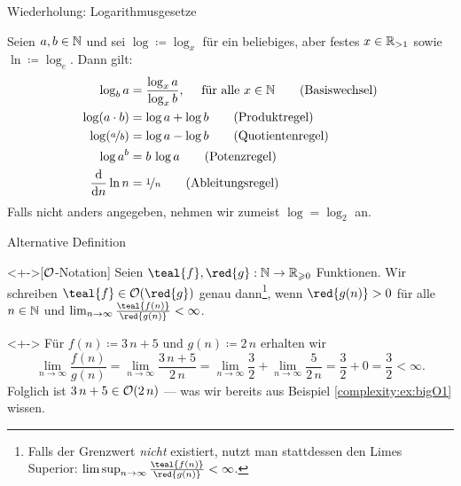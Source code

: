\begin{frame}{Wiederholung: Logarithmusgesetze}
\begin{theorem}
Seien $a, b \in \mathbb{N}$ und sei $\log \coloneqq \log_x$ f\"ur ein beliebiges, aber festes $x \in \mathbb{R}_{>1}$ sowie $\ln \coloneqq \log_e$. Dann gilt:
\begin{align*}
    \log_b a &= \frac{\log_x a}{\log_x b}, \quad \text{ f\"ur alle $x \in \mathbb{N}$}\tag{Basiswechsel} \\
    \log(a \cdot b) &= \log a + \log b\tag{Produktregel} \\
    \log(\nicefrac{a}{b}) &= \log a - \log b\tag{Quotientenregel} \\
    \log a^b &= b \, \log a\tag{Potenzregel}\\
    \frac{\text{d}}{\text{d}n} \ln n &= \nicefrac{1}{n}\tag{Ableitungsregel}
\end{align*}
Falls nicht anders angegeben, nehmen wir zumeist $\log = \log_2$ an.
\end{theorem}
\end{frame}

\begin{frame}{Alternative Definition}
\begin{definition}<+->[$\mathcal{O}$-Notation]
Seien $\teal{f}, \red{g}: \nat \to \realpos$ Funktionen.
Wir schreiben $\teal{f} \in \bigO(\red{g})$ genau dann\footnote[frame]{Falls der Grenzwert \emph{nicht} existiert, nutzt man stattdessen den \alert{Limes Superior}: $\limsup_{n \to \infty} \frac{\teal{f(n)}}{\red{g(n)}} < \infty$.}, wenn $\red{g(n)} > 0$ f\"ur alle $n \in \mathbb{N}$ und $\lim_{n \to \infty} \frac{\teal{f(n)}}{\red{g(n)}} < \infty$.
\end{definition}

\begin{example}<+->
F\"ur $f(n) \coloneqq 3 \, n + 5$ und $g(n) \coloneqq 2 \, n$ erhalten wir $$\lim_{n \to \infty} \frac{f(n)}{g(n)} = \lim_{n \to \infty} \frac{3 \, n + 5}{2 \, n} = \lim_{n \to \infty} \frac{3}{2} + \lim_{n \to \infty} \frac{5}{2 \, n} = \frac{3}{2} + 0 = \frac{3}{2} < \infty.$$
Folglich ist $3 \, n + 5 \in \mathcal{O}(2 \, n)$ --- was wir bereits aus Beispiel \ref{complexity:ex:bigO1} wissen.
\end{example}
\end{frame}

